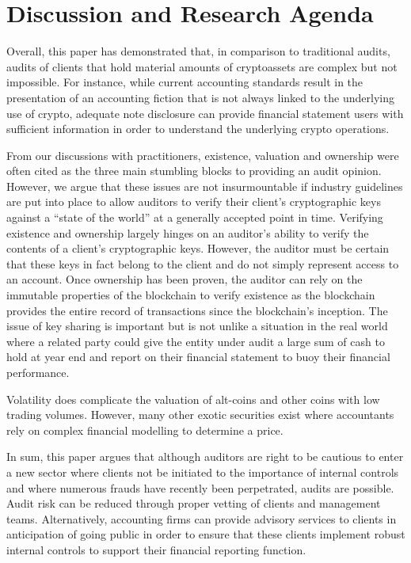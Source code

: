 \section{Discussion and Research Agenda}


Overall, this paper has demonstrated that, in comparison to traditional audits, audits of clients that hold material amounts of cryptoassets are complex but not impossible. For instance, while current accounting standards result in the presentation of an accounting fiction that is not always linked to the underlying use of crypto, adequate note disclosure can provide financial statement users with sufficient information in order to understand the underlying crypto operations. 

From our discussions with practitioners, existence, valuation and ownership were often cited as the three main stumbling blocks to providing an audit opinion. However, we argue that these issues are not insurmountable if industry guidelines are put into place to allow auditors to verify their client’s cryptographic keys against a “state of the world” at a generally accepted point in time. Verifying existence and ownership largely hinges on an auditor’s ability to verify the contents of a client’s cryptographic keys. However, the auditor must be certain that these keys in fact belong to the client and do not simply represent access to an account. Once ownership has been proven, the auditor can rely on the immutable properties of the blockchain to verify existence as the blockchain provides the entire record of transactions since the blockchain’s inception. The issue of key sharing is important but is not unlike a situation in the real world where a related party could give the entity under audit a large sum of cash to hold at year end and report on their financial statement to buoy their financial performance. 

Volatility does complicate the valuation of alt-coins and other coins with low trading volumes. However, many other exotic securities exist where accountants rely on complex financial modelling to determine a price. 

In sum, this paper argues that although auditors are right to be cautious to enter a new sector where clients not be initiated to the importance of internal controls and where numerous frauds have recently been perpetrated, audits are possible. Audit risk can be reduced through proper vetting of clients and management teams. Alternatively, accounting firms can provide advisory services to clients in anticipation of going public in order to ensure that these clients implement robust internal controls to support their financial reporting function. 

